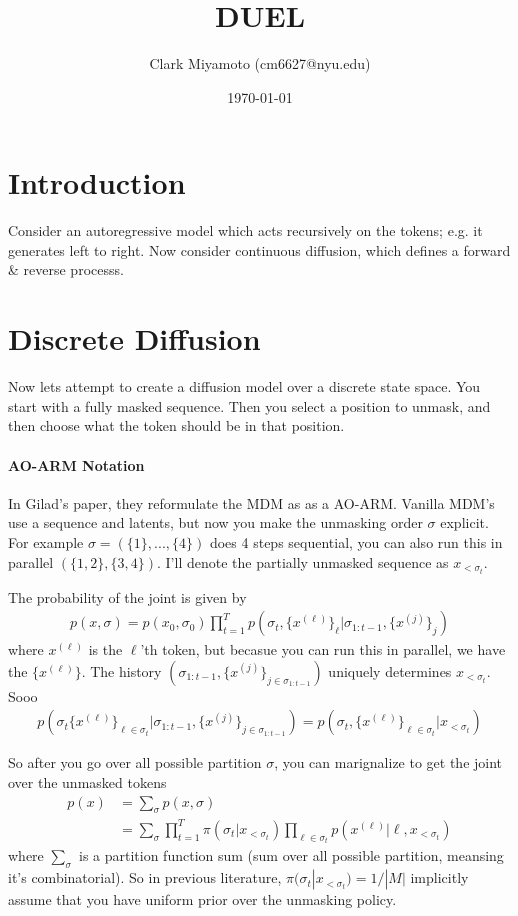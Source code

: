 \documentclass[12pt,fleqn]{article}
\title{DUEL}
\author{Clark Miyamoto (cm6627@nyu.edu)}
\date{\today}
\numberwithin{equation}{section} %
\begin{document}
\maketitle

\section{Introduction}
Consider an autoregressive model which acts recursively on the tokens; e.g. it generates left to right. Now consider continuous diffusion, which defines a forward \& reverse processs.


\section{Discrete Diffusion}
Now lets attempt to create a diffusion model over a discrete state space. You start with a fully masked sequence. Then you select a position to unmask, and then choose what the token should be in that position.

\paragraph{AO-ARM Notation} In Gilad's paper, they reformulate the MDM as as a AO-ARM. Vanilla MDM's use a sequence and latents, but now you make the unmasking order $\sigma$ explicit. For example $\sigma = (\{1\}, ..., \{4\})$ does 4 steps sequential, you can also run this in parallel $(\{1,2\}, \{3,4\})$. I'll denote the partially unmasked sequence as $x_{<\sigma_t}$. 

The probability of the joint is given by
\begin{align}
	p(x,\sigma) = p(x_0, \sigma_0) \prod_{t=1}^T p(\sigma_t, \{x^{(\ell)}\}_\ell | \sigma_{1:t-1}, \{x^{(j)}\}_j)
\end{align}
where $x^{(\ell)}$ is the $\ell$'th token, but becasue you can run this in parallel, we have the $\{x^{(\ell)}\}$. The history $(\sigma_{1:t-1}, \{x^{(j)}\}_{j \in \sigma_{1:t-1}})$ uniquely determines $x_{< \sigma_t}$. Sooo
\begin{align}
	p(\sigma_t \{x^{(\ell)}\}_{\ell \in \sigma_t}
 | \sigma_{1:t-1}, \{x^{(j)}\}_{j \in \sigma_{1:t-1}}) = p(\sigma_t , \{x^{(\ell)}\}_{\ell \in \sigma_t}  | x_{< \sigma_t})
 \end{align}
 
 
 So after you go over all possible partition $\sigma$, you can marignalize to get the joint over the unmasked tokens
 \begin{align}
 	p(x) & = \sum_\sigma p(x, \sigma)\\
 	& = \sum_\sigma \prod_{t=1}^T  \pi(\sigma_t | x_{< \sigma_t}) \prod_{\ell \in \sigma_t} p(x^{(\ell)} | \ell, x_{< \sigma_t})
 \end{align}
where $\sum_\sigma$ is a partition function sum (sum over all possible partition, meansing it's combinatorial). So in previous literature, $\pi(\sigma_t | x_{< \sigma_t}) = 1/ |M|$ implicitly assume that you have uniform prior over the unmasking policy. 
\end{document}
